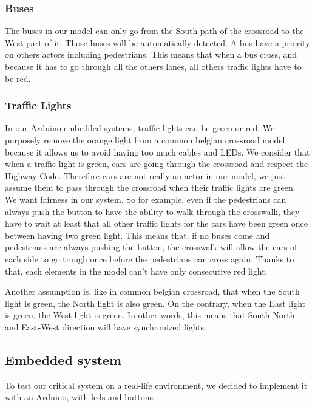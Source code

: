 \subsubsection{Buses}
The buses in our model can only go from the South path of the crossroad to the West part of it. Those buses will be automatically detected. A bus have a priority on others actors including pedestrians. This means that when a bus cross, and because it has to go through all the others lanes, all others traffic lights have to be red.

\subsubsection{Traffic Lights}
In our Arduino embedded systems, traffic lights can be green or red. We purposely remove the orange light from a common belgian crossroad model because it allows us to avoid having too much cables and LEDs. We consider that when a traffic light is green, cars are going through the crossroad and respect the Highway Code. Therefore cars are not really an actor in our model, we just assume them to pass through the crossroad when their traffic lights are green. \\

We want fairness in our system. So for example, even if the pedestrians can always push the button to have the ability to walk through the crosswalk, they have to wait at least that all other traffic lights for the cars have been green once between having two green light. This means that, if no buses come and pedestrians are always pushing the button, the crosswalk will allow the cars of each side to go trough once before the pedestrians can cross again. Thanks to that, each elements in the model can't have only consecutive red light.

Another assumption is, like in common belgian crossroad, that when the South light is green, the North light is also green. On the contrary, when the East light is green, the West light is green. In other words, this means that South-North and East-West direction will have synchronized lights.


\subsection{Embedded system}

To test our critical system on a real-life environment, we decided to implement it with an Arduino, with leds and buttons.

